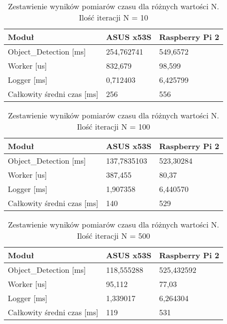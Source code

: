 \begin{table}[hbt!]
\caption[Ilość iteracji N = 10]{Zestawienie wyników pomiarów czasu dla różnych wartości N. Ilość iteracji N = 10}
\begin{tabularx}{\textwidth}{|l|X|X|} 
 \hline
Moduł&	ASUS x53S&	Raspberry Pi 2\\ \hline
Object\_Detection [ms]	&254,762741&	549,6572\\
Worker [us]	&832,679&	98,599\\
Logger [ms]	&0,712403&	6,425799\\
Całkowity średni czas [ms]&	256&	556 \\
\hline
\end{tabularx}  
\label{tab:compareAnalysers}
\end{table}


\begin{table}[hbt!]
\caption[Ilość iteracji N = 100]{Zestawienie wyników pomiarów czasu dla różnych wartości N. Ilość iteracji N = 100}
\begin{tabularx}{\textwidth}{|l|X|X|} 
 \hline
Moduł&	ASUS x53S	&Raspberry Pi 2 \\ \hline
Object\_Detection [ms]&	137,7835103	&523,30284 \\
Worker [us]	&387,455	&80,37 \\
Logger [ms]&	1,907358&	6,440570 \\
Całkowity średni czas [ms]	&140&	529 \\
\hline
\end{tabularx}  
\label{tab:compareAnalysers}
\end{table}


\begin{table}[hbt!]
\caption[Ilość iteracji N = 500]{Zestawienie wyników pomiarów czasu dla różnych wartości N. Ilość iteracji N = 500}
\begin{tabularx}{\textwidth}{|l|X|X|} 
 \hline
Moduł&	ASUS x53S	&Raspberry Pi 2\\ \hline
Object\_Detection [ms]&	118,555288	&525,432592\\
Worker [us]&	95,112&	77,03\\
Logger [ms]&	1,339017&	6,264304\\
Całkowity średni czas [ms]&	119&	531\\
\hline
\end{tabularx}  
\label{tab:compareAnalysers}
\end{table}

